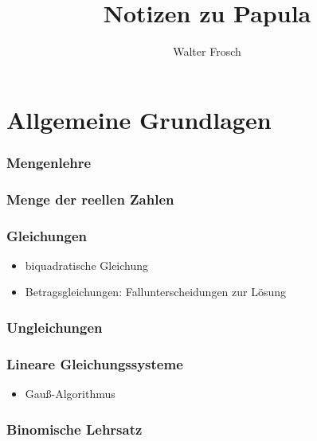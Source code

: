 \documentclass[12pt,a4paper]{article}
\author{Walter Frosch}
\title{Notizen zu Papula}
\begin{document}



\newpage

\part{Allgemeine Grundlagen}

\section{Mengenlehre}

\section{Menge der reellen Zahlen}

\section{Gleichungen}
\begin{itemize}
  \item biquadratische Gleichung
  \item Betragsgleichungen: Fallunterscheidungen zur Lösung
\end{itemize}

\section{Ungleichungen}

\section{Lineare Gleichungssysteme}

\begin{itemize}
  \item Gauß-Algorithmus
\end{itemize}

\section{Binomische Lehrsatz}
\end{document}

